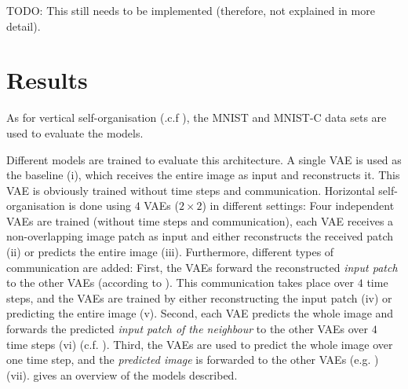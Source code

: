TODO: This still needs to be implemented (therefore, not explained in more detail).


\section{Results}
As for vertical self-organisation (.c.f ), the MNIST \cite{Lecun_Bottou_Bengio_Haffner_1998} and MNIST-C \cite{Mu_Gilmer_2019} data sets are used to evaluate the models. 

Different models are trained to evaluate this architecture. A single VAE is used as the baseline (i), which receives the entire image as input and reconstructs it. This VAE is obviously trained without time steps and communication. Horizontal self-organisation is done using $4$ VAEs ($2\times 2$) in different settings: Four independent VAEs are trained (without time steps and communication), each VAE receives a non-overlapping image patch as input and either reconstructs the received patch (ii) or predicts the entire image (iii). Furthermore, different types of communication are added: First, the VAEs forward the reconstructed \emph{input patch} to the other VAEs (according to ). This communication takes place over $4$ time steps, and the VAEs are trained by either reconstructing the input patch (iv) or predicting the entire image (v). Second, each VAE predicts the whole image and forwards the predicted \emph{input patch of the neighbour} to the other VAEs over $4$ time steps  (vi) (c.f. ). Third, the VAEs are used to predict the whole image over one time step, and the \emph{predicted image} is forwarded to the other VAEs (e.g. ) (vii).  gives an overview of the models described.


